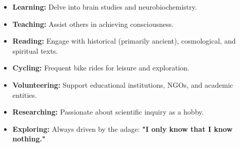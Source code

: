 
\begin{itemize}
    \item \textbf{Learning:} Delve into brain studies and neurobiochemistry.
    \item \textbf{Teaching:} Assist others in achieving consciousness.
    \item \textbf{Reading:} Engage with historical (primarily ancient), cosmological, and spiritual texts.
    \item \textbf{Cycling:} Frequent bike rides for leisure and exploration.
    \item \textbf{Volunteering:} Support educational institutions, NGOs, and academic entities.
    \item \textbf{Researching:} Passionate about scientific inquiry as a hobby.
    \item \textbf{Exploring:} Always driven by the adage: \textbf{"I only know that I know nothing."}
\end{itemize}
